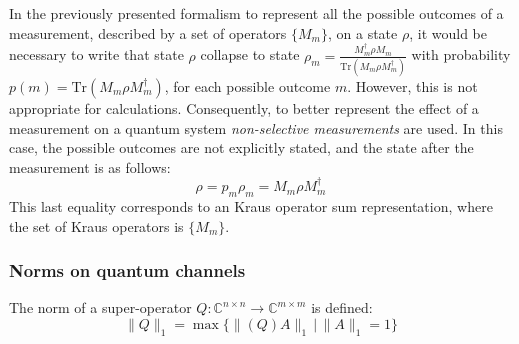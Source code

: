 In the previously presented formalism to represent all the possible outcomes of a measurement, described by a set of operators $\{M_{m}\}$, on a state $\rho$, it would be necessary to write that state $\rho$ collapse to state $\rho_m=\frac{M_{m}^{\dag}\rho M_{m}}{\text{Tr}(M_{m}\rho M_{m}^{\dag})}$ with probability $p(m)=\text{Tr}(M_{m}\rho M_{m}^{\dag})$, for each possible outcome $m$. However, this is not appropriate for calculations. Consequently, to better represent the effect of a measurement on a quantum system \emph{non-selective measurements} are used. In this case, the possible outcomes are not explicitly stated, and the state after the measurement is as follows:
\begin{equation*}
  \rho = p_m \rho_m = M_m \rho M^{\dag}_m
\end{equation*}
This last equality corresponds to an Kraus operator sum representation, where the set of Kraus operators is $\{M_{m}\}$.






\subsubsection{Norms on quantum channels}
\begin{definition}
  The norm of a super-operator $Q: \mathbb{C}^{n\times n} \xrightarrow{} \mathbb{C}^{m\times m }$ is defined:
  \begin{equation} 
    \lVert Q \rVert_{1} =  \max\{\lVert (Q) A \rVert_{1} \hspace{2pt}  \vert \hspace{2pt}  \lVert A \rVert_{1}=1\} 
  \end{equation}
\end{definition}

